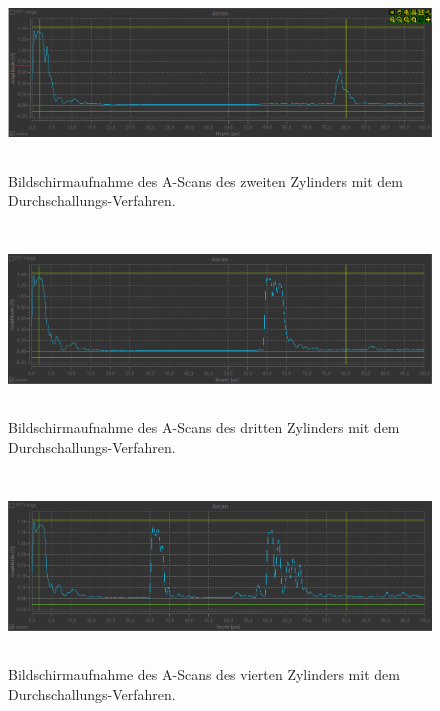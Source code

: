\begin{figure}
    \centering
    \includegraphics[width=15cm, height=5cm]{build/Messung3.2.png}
    \caption{Bildschirmaufnahme des A-Scans des zweiten Zylinders mit dem Durchschallungs-Verfahren.}
    \label{fig:m3.2}
\end{figure}

\begin{figure}
    \centering
    \includegraphics[width=15cm, height=5cm]{build/Messung3.3.png}
    \caption{Bildschirmaufnahme des A-Scans des dritten Zylinders mit dem Durchschallungs-Verfahren.}
    \label{fig:m3.3}
\end{figure}

\begin{figure}
    \centering
    \includegraphics[width=15cm, height=5cm]{build/Messung3.4.png}
    \caption{Bildschirmaufnahme des A-Scans des vierten Zylinders mit dem Durchschallungs-Verfahren.}
    \label{fig:m3.4}
\end{figure}

